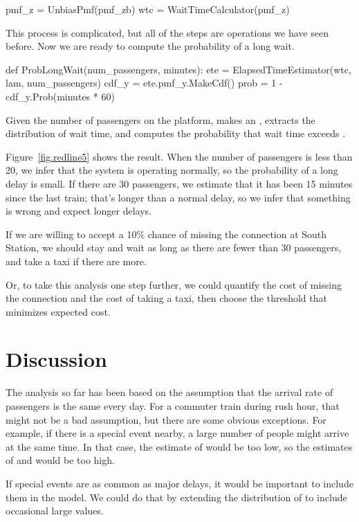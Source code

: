 \documentclass[12pt]{book}
\theoremstyle{exercise}
\begin{document}
\begin{code}
    pmf_z = UnbiasPmf(pmf_zb)
    wtc = WaitTimeCalculator(pmf_z)
\end{code}

This process is complicated, but
all of the steps are operations we have seen before.
Now we are ready to compute the probability of a long wait.

\begin{code}
def ProbLongWait(num_passengers, minutes):
    ete = ElapsedTimeEstimator(wtc, lam, num_passengers)
    cdf_y = ete.pmf_y.MakeCdf()
    prob = 1 - cdf_y.Prob(minutes * 60)
\end{code}

Given the number of passengers on the platform,
makes an ,
extracts the distribution of wait time, and 
computes 
the probability that wait time
exceeds .

Figure~\ref{fig.redline5} shows the result.  When the number of
passengers is less than 20, we infer that the system is
operating normally, so the probability of a long delay is small.
If there are 30 passengers, we estimate that it has been 15
minutes since the last train; that's longer than a normal delay,
so we infer that something is wrong and expect longer delays.

If we are willing to accept a 10\% chance of missing the connection
at South Station, we should stay and wait as long as there
are fewer than 30 passengers, and take a taxi if there are more.

Or, to take this analysis one step further, we could quantify the cost
of missing the connection and the cost of taking a taxi, then choose
the threshold that minimizes expected cost.

\section{Discussion}

The analysis so far has been based on the assumption that the
arrival rate of passengers is the same every day.  For a commuter
train during rush hour, that might not be a bad assumption, but
there are some obvious exceptions.  For example, if there is a special
event nearby, a large number of people might arrive at the same time.
In that case, the estimate of  would be too low, so the
estimates of  and  would be too high.

If special events are as common as major delays, it would
be important to include them in the model.  We could do that by
extending the distribution of  to include occasional
large values.
\end{document}
